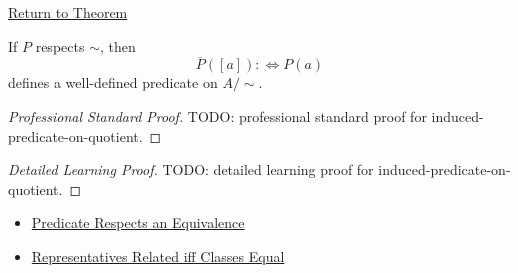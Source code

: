 \newpage
{}
\label{prf:induced-predicate-on-quotient}

\begin{remark*}[Return]
\hyperref[thm:induced-predicate-on-quotient]{Return to Theorem}
\end{remark*}

\begin{theorem*}
If $P$ respects $\sim$, then
\[
\overline{P}([a]):\Longleftrightarrow P(a)
\]
defines a well-defined predicate on $A/{\sim}$.
\end{theorem*}

\begin{proof}[Professional Standard Proof]
\LRAProofBodyStart
TODO: professional standard proof for induced-predicate-on-quotient.
\end{proof}

\begin{proof}[Detailed Learning Proof]
\LRAProofBodyStart
TODO: detailed learning proof for induced-predicate-on-quotient.
\end{proof}

\begin{remark*}
\end{remark*}

\begin{dependencies}
\begin{itemize}
  \item \hyperref[def:predicate-respects-equivalence]{Predicate Respects an Equivalence}
  \item \hyperref[prop:representatives-related-iff-classes-equal]{Representatives Related iff Classes Equal}
\end{itemize}
\end{dependencies}

\clearpage
